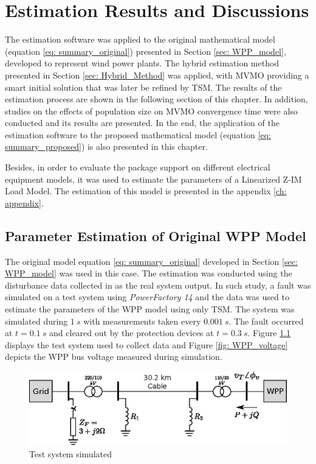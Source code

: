 \chapter{Estimation Results and Discussions}
\label{ch: Results}

The estimation software was applied to the original mathematical model (equation \ref{eq: summary_original}) presented in Section \ref{sec: WPP_model}, developed to represent wind power plants. The hybrid estimation method presented in Section \ref{sec: Hybrid_Method} was applied, with MVMO providing a smart initial solution that was later be refined by TSM. The results of the estimation process are shown in the following section of this chapter. In addition, studies on the effects of population size on MVMO convergence time were also conducted and its results are presented. In the end, the application of the estimation software to the proposed mathematical model (equation \ref{eq: summary_proposed}) is also presented in this chapter.

Besides, in order to evaluate the package support on different electrical equipment models, it was used to estimate the parameters of a Linearized Z-IM Load Model. The estimation of this model is presented in the appendix \ref{ch: appendix}.

\section{Parameter Estimation of Original WPP Model}

The original model equation \eqref{eq: summary_original} developed in Section \ref{sec: WPP_model} was used in this case. The estimation was conducted using the disturbance data collected in \cite{Cari2015} as the real system output. In such study, a fault was simulated on a test system using \textit{PowerFactory 14} and the data was used to estimate the parameters of the WPP model using only TSM. The system was simulated during $1\ s$ with measurements taken every $0.001\ s$. The fault occurred at $t=0.1\ s$ and cleared out by the protection devices at $t=0.3\ s$. Figure \ref{fig: test_system} displays the test system used to collect data and Figure \ref{fig: WPP_voltage} depicts the WPP bus voltage measured during simulation.

\begin{figure}[!h]
	\caption{Test system simulated}
	\begin{center}
		\includegraphics[scale=1]{Images/Cari_test_system.eps}
	\end{center}
	\label{fig: test_system}
\end{figure}

